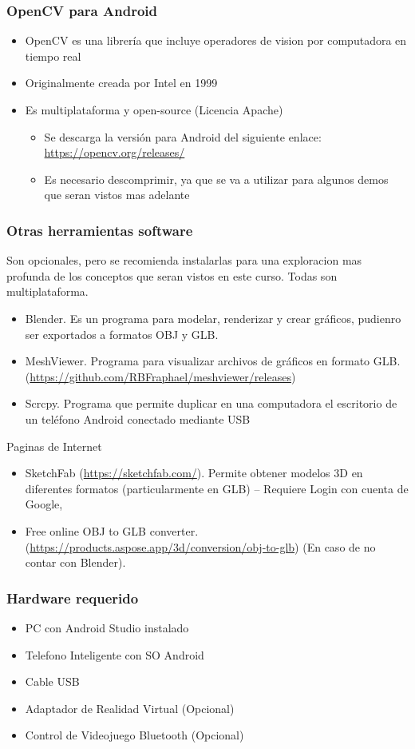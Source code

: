 

\begin{frame}
\frametitle{OpenCV para Android}  
\begin{itemize}
\item OpenCV es una librer\'ia que incluye operadores de vision por computadora en tiempo real
\item Originalmente creada por Intel en 1999
\item Es multiplataforma y open-source (Licencia Apache)
\begin{itemize}
\item Se descarga la versi\'on para Android del siguiente enlace: \url{https://opencv.org/releases/}
\item Es necesario descomprimir, ya que se va a utilizar para algunos demos que seran vistos mas adelante
\end{itemize}
\end{itemize}
\end{frame}

\begin{frame}
\frametitle{Otras herramientas software}  
Son opcionales, pero se recomienda instalarlas para una exploracion mas profunda de los conceptos que seran vistos en este curso. Todas son multiplataforma.
\begin{itemize}
\item Blender. Es un programa para modelar, renderizar y crear gr\'aficos, pudienro ser exportados a formatos OBJ y GLB. 
\item MeshViewer. Programa para visualizar archivos de gr\'aficos en formato GLB. (\url{https://github.com/RBFraphael/meshviewer/releases})
\item Scrcpy. Programa que permite duplicar en una computadora el escritorio de un tel\'efono Android conectado mediante USB
\end{itemize}
Paginas de Internet
\begin{itemize}
\item SketchFab (\url{https://sketchfab.com/}). Permite obtener modelos 3D en diferentes formatos (particularmente en GLB) -- Requiere Login con cuenta de Google, 
\item Free online OBJ to GLB converter. (\url{https://products.aspose.app/3d/conversion/obj-to-glb}) (En caso de no contar con Blender). 
\end{itemize}
\end{frame}

\begin{frame}
\frametitle{Hardware requerido}  
\begin{itemize}
\item PC con Android Studio instalado 
\item Telefono Inteligente con SO Android
\item Cable USB
\item Adaptador de Realidad Virtual (Opcional)
\item Control de Videojuego Bluetooth (Opcional)
\end{itemize}
\end{frame}
